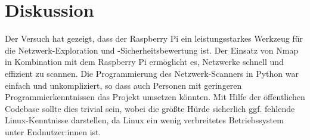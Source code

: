 \documentclass[12pt]{article}
\begin{document}
\section{Diskussion}

Der Versuch hat gezeigt, dass der Raspberry Pi ein leistungsstarkes Werkzeug für die Netzwerk-Exploration und -Sicherheitsbewertung ist. Der Einsatz von Nmap in Kombination mit dem Raspberry Pi ermöglicht es, Netzwerke schnell und effizient zu scannen. Die Programmierung des Netzwerk-Scanners in Python war einfach und unkompliziert, so dass auch Personen mit geringeren Programmierkenntnissen das Projekt umsetzen könnten. Mit Hilfe der öffentlichen Codebase sollte dies trivial sein, wobei die größte Hürde sicherlich ggf. fehlende Linux-Kenntnisse darstellen, da Linux ein wenig verbreitetes Betriebssystem unter Endnutzer:innen ist.

\newpage
\thispagestyle{empty}
\printbibliography

\clearpage
\end{document}
